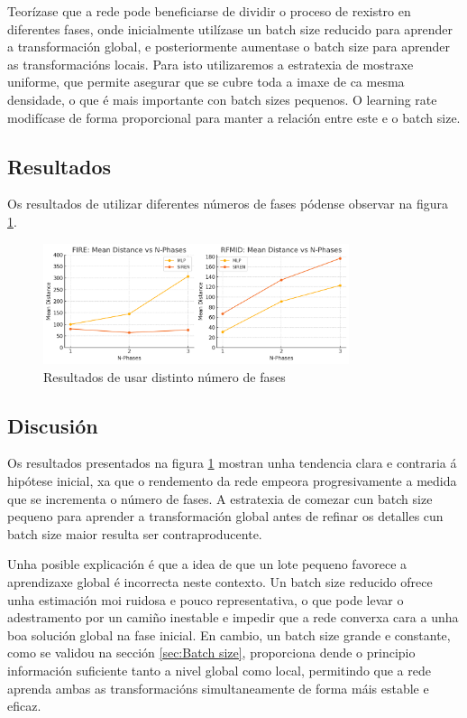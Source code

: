 Teorízase que a rede pode beneficiarse de dividir o proceso de rexistro en diferentes fases, onde inicialmente utilízase un batch size reducido para aprender a transformación global, e posteriormente aumentase o batch size para aprender as transformacións locais.
Para isto utilizaremos a estratexia de mostraxe uniforme, que permite asegurar que se cubre toda a imaxe de ca mesma densidade, o que é mais importante con batch sizes pequenos. O learning rate modifícase de forma proporcional para manter a relación entre este e o batch size.

\subsection{Resultados}
\label{subsec:Resultados-phases}

Os resultados de utilizar diferentes números de fases pódense observar na figura \ref{fig:nphases}.
\begin{figure}[ht]
    \centering
    \includegraphics[width=0.8\textwidth]{imaxes/lottery/nphases.png}
    \caption{Resultados de usar distinto número de fases}
    \label{fig:nphases}
\end{figure}


\subsection{Discusión}
\label{subsec:Discusion-phases}

Os resultados presentados na figura \ref{fig:nphases} mostran unha tendencia clara e contraria á hipótese inicial, xa que o rendemento da rede empeora progresivamente a medida que se incrementa o número de fases. A estratexia de comezar cun batch size pequeno para aprender a transformación global antes de refinar os detalles cun batch size maior resulta ser contraproducente.

Unha posible explicación é que a idea de que un lote pequeno favorece a aprendizaxe global é incorrecta neste contexto. Un batch size reducido ofrece unha estimación moi ruidosa e pouco representativa, o que pode levar o adestramento por un camiño inestable e impedir que a rede converxa cara a unha boa solución global na fase inicial. En cambio, un batch size grande e constante, como se validou na sección \ref{sec:Batch size}, proporciona dende o principio información suficiente tanto a nivel global como local, permitindo que a rede aprenda ambas as transformacións simultaneamente de forma máis estable e eficaz.

